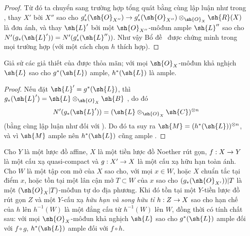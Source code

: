 \documentclass[oneside,10pt]{amsart}
\makeatletter
\newcommand{\ega@arrow}[2]{\mathchoice{#1}{#2}{#2}{#2}}
\renewcommand{\to}{\ega@arrow{\longrightarrow}{\rightarrow}}
\let\EGAOriginalLabel\label
\renewcommand{\label}[1]{\phantomsection\EGAOriginalLabel{#1}}
\makeatother
\begin{document}
\begin{proof}
Từ đó ta chuyển sang trường hợp tổng quát bằng cùng lập luận như trong , thay $X'$ bởi $X''$ sao cho $g'_*(\sh{O}_{X''})\to g'_*(\sh{O}_{X''})\otimes_{\sh{O}_X}\sh{R}(X)$ là đơn ánh, và thay $\sh{L}'$ bởi một $\sh{O}_{X''}$-môđun ample $\sh{L}''$ sao cho $N'(g_*(\sh{L}'))=N'(g'_*(\sh{L}''))$.
Như vậy Bổ đề~ được chứng minh trong mọi trường hợp (với một cách chọn $h$ thích hợp).
\end{proof}

\begin{corollary}[6.6.10]
\label{II.6.6.10}
Giả sử các giả thiết của  được thỏa mãn;
với mọi $\sh{O}_X$-môđun khả nghịch $\sh{L}$ sao cho $g^*(\sh{L})$ ample, $h^*(\sh{L})$ là ample.
\end{corollary}

\begin{proof}
Nếu đặt $\sh{L}'=g^*(\sh{L})$, thì $g_*(\sh{L}')=\sh{L}\otimes_{\sh{O}_X}\sh{B}$ , do đó
\[
  N'(g_*(\sh{L}')) = (\sh{L}\otimes_{\sh{O}_X}\sh{C})^{\otimes n}
\]
(bằng cùng lập luận như đối với ).
Do đó ta suy ra $\sh{M}=(h^*(\sh{L}))^{\otimes n}$, và vì $\sh{M}$ ample nên $h^*(\sh{L})$ cũng ample .
\end{proof}

\begin{proposition}[6.6.11]
\label{II.6.6.11}
Cho $Y$ là một lược đồ affine, $X$ là một tiền lược đồ Noether rút gọn, $f:X\to Y$ là một cấu xạ quasi-compact và $g:X'\to X$ là một cấu xạ hữu hạn toàn ánh.
Cho $W$ là một tập con mở của $X$ sao cho, với mọi $x\in W$, hoặc $X$ chuẩn tắc tại điểm $x$, hoặc tồn tại một lân cận mở $T\subset W$ của $x$ sao cho $(g_*(\sh{O}_{X'}))|T$ là một $(\sh{O}_X|T)$-môđun tự do địa phương.
Khi đó tồn tại một $Y$-tiền lược đồ rút gọn $Z$ và một $Y$-cấu xạ \emph{hữu hạn và song hữu tỉ} $h:Z\to X$ sao cho hạn chế của $h$ lên $h^{-1}(W)$ là một đẳng cấu từ $h^{-1}(W)$ lên $W$, đồng thời có tính chất sau: với mọi $\sh{O}_X$-môđun khả nghịch $\sh{L}$ sao cho $g^*(\sh{L})$ ample đối với $f\circ g$, $h^*(\sh{L})$ ample đối với $f\circ h$.
\end{proposition}
\end{document}
